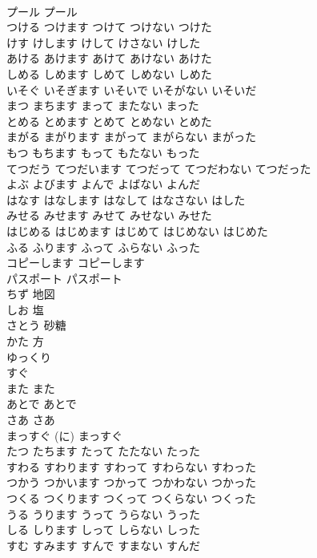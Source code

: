 \documentclass[8pt]{extreport}
\begin{document}
\begin{CJK}{UTF8}{min}
\\	プール	プール
\\	つける	つけます	つけて	つけない	つけた	
\\	けす	けします	けして	けさない	けした	
\\	あける	あけます	あけて	あけない	あけた	
\\	しめる	しめます	しめて	しめない	しめた	
\\	いそぐ	いそぎます	いそいで	いそがない	いそいだ	
\\	まつ	まちます	まって	またない	まった	
\\	とめる	とめます	とめて	とめない	とめた	
\\	まがる	まがります	まがって	まがらない	まがった	
\\	もつ	もちます	もって	もたない	もった	
\\	てつだう	てつだいます	てつだって	てつだわない	てつだった	
\\	よぶ	よびます	よんで	よばない	よんだ	
\\	はなす	はなします	はなして	はなさない	はした	
\\	みせる	みせます	みせて	みせない	みせた	
\\	はじめる	はじめます	はじめて	はじめない	はじめた	
\\	ふる	ふります	ふって	ふらない	ふった	
\\	コピーします	コピーします
\\	パスポート	パスポート
\\	ちず	地図
\\	しお	塩
\\	さとう	砂糖
\\	かた	方
\\	ゆっくり	
\\	すぐ	
\\	また	また
\\	あとで	あとで
\\	さあ	さあ
\\	まっすぐ (に)	まっすぐ
\\	たつ	たちます	たって	たたない	たった	
\\	すわる	すわります	すわって	すわらない	すわった	
\\	つかう	つかいます	つかって	つかわない	つかった	
\\	つくる	つくります	つくって	つくらない	つくった	
\\	うる	うります	うって	うらない	うった	
\\	しる	しります	しって	しらない	しった	
\\	すむ	すみます	すんで	すまない	すんだ	

\end{CJK}
\end{document}
